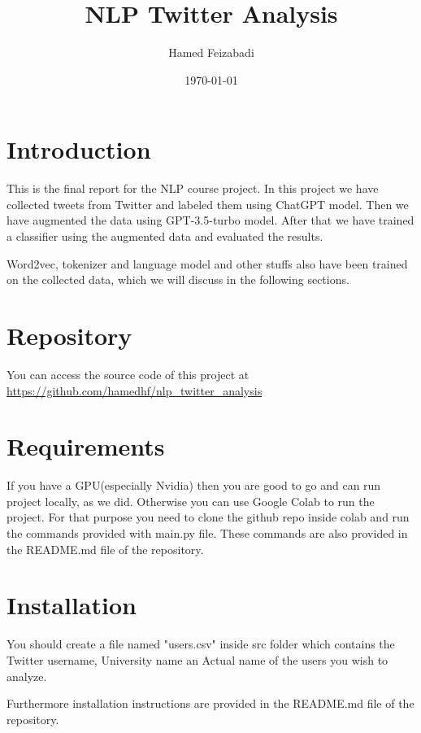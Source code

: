 \documentclass[12pt, letterpaper]{article}
\title{NLP Twitter Analysis}
\author{Hamed Feizabadi}
\date{\today}
\begin{document}
    \maketitle
    \tableofcontents
    \newpage


    \section{Introduction}\label{sec:introduction}
    This is the final report for the NLP course project. In this project we have collected tweets from Twitter and labeled them using ChatGPT model. Then we have augmented the data using GPT-3.5-turbo model. After that we have trained a classifier using the augmented data and evaluated the results.

    Word2vec, tokenizer and language model and other stuffs also have been trained on the collected data, which we will discuss in the following sections.


    \section{Repository}\label{sec:repository}
    You can access the source code of this project at \url{https://github.com/hamedhf/nlp_twitter_analysis}

    \section{Requirements}\label{sec:requirements}
    If you have a GPU(especially Nvidia) then you are good to go and can run project locally, as we did. Otherwise you can use Google Colab to run the project. For that purpose you need to clone the github repo inside colab and run the commands provided with main.py file. These commands are also provided in the README.md file of the repository.

    \section{Installation}\label{sec:installation}
    You should create a file named "users.csv" inside src folder which contains the Twitter username, University name an Actual name of the users you wish to analyze.

    Furthermore installation instructions are provided in the README.md file of the repository.
\end{document}
